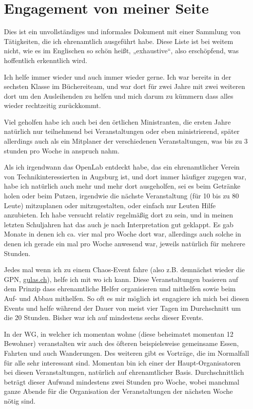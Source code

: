 \documentclass{scrartcl}
\begin{document}
\section*{Engagement von meiner Seite}
Dies ist ein unvollständiges und informales Dokument mit einer Sammlung von Tätigkeiten,
die ich ehrenamtlich ausgeführt habe. Diese Liste ist bei weitem nicht, wie es im Englischen so
schön heißt, „exhaustive“, also erschöpfend, was hoffentlich erkenntlich wird.

Ich helfe immer wieder und auch immer wieder gerne. Ich war bereits in der sechsten Klasse im
Büchereiteam, und war dort für zwei Jahre mit zwei weiteren dort um den Ausleihenden zu helfen
und mich darum zu kümmern dass alles wieder rechtzeitig zurückkommt.

Viel geholfen habe ich auch bei den örtlichen Ministranten, die ersten Jahre natürlich nur
teilnehmend bei Veranstaltungen oder eben ministrierend, später allerdings auch als ein
Mitplaner der verschiedenen Veranstaltungen, was bis zu 3 stunden pro Woche in anspruch nahm.

Als ich irgendwann das OpenLab entdeckt habe, das ein ehrenamtlicher
Verein von Technikinteressierten in Augsburg ist, und dort immer häufiger zugegen war, habe ich
natürlich auch mehr und mehr dort ausgeholfen, sei es beim Getränke holen oder beim Putzen, irgendwie
die nächste Veranstaltung (für 10 bis zu 80 Leute) mitzuplanen oder mitzugestalten, oder einfach nur
Leuten Hilfe anzubieten. Ich habe versucht relativ regelmäßig
dort zu sein, und in meinen letzten Schuljahren hat das auch je nach Interpretation gut geklappt.
Es gab Monate in denen ich ca. vier mal pro Woche dort war, allerdings auch solche in denen ich gerade ein
mal pro Woche anwesend war, jeweils natürlich für mehrere Stunden.

Jedes mal wenn ich zu einem Chaos-Event fahre (also z.B. demnächst wieder die GPN, \url{gulas.ch}),
helfe ich mit wo ich kann. Diese Veranstaltungen basieren auf dem Prinzip dass ehrenamtliche Helfer
organisieren und mithelfen sowie beim Auf- und Abbau mithelfen. So oft es mir möglich ist engagiere
ich mich bei diesen Events und helfe während der Dauer von meist vier Tagen im Durchschnitt um die
20 Stunden. Bisher war ich auf mindestens sechs dieser Events.

In der WG, in welcher ich momentan wohne (diese beheimatet momentan 12 Bewohner) veranstalten wir auch des öfteren
beispielsweise gemeinsame Essen, Fahrten und auch Wanderungen. Des weiteren gibt es Vorträge, die im Normalfall
für alle sehr interessant sind. Momentan bin ich einer
der Haupt-Organisatoren bei diesen Veranstaltungen, natürlich auf ehrenamtlicher Basis.
Durchschnittlich beträgt dieser Aufwand mindestens zwei Stunden pro Woche, wobei manchmal ganze Abende
für die Organisation der Veranstaltungen der nächsten Woche nötig sind.
\end{document}
